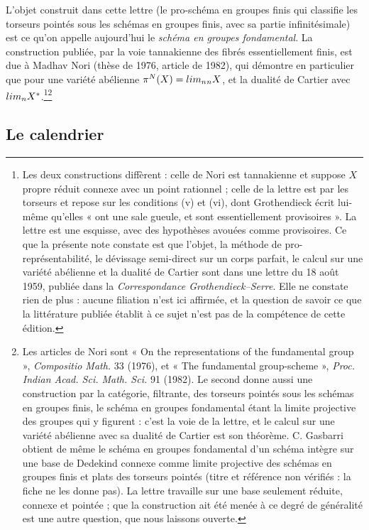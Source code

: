 \documentclass[11pt,a4paper]{article}
\begin{document}
L'objet construit dans cette lettre (le pro-schéma en groupes finis qui
classifie les torseurs pointés sous les schémas en groupes finis, avec sa
partie infinitésimale) est ce qu'on appelle aujourd'hui le \emph{schéma en
groupes fondamental}. La construction publiée, par la voie tannakienne des
fibrés essentiellement finis, est due à Madhav Nori (thèse de 1976, article de
1982), qui démontre en particulier que pour une variété abélienne
$\pi^{N}(X) = \varprojlim_{n} {}_{n}X$, et la dualité de Cartier avec
$\varinjlim {}_{n}X^{*}$.\footnote{Les deux constructions diffèrent :
celle de Nori est tannakienne et suppose $X$ propre réduit connexe avec un
point rationnel ; celle de la lettre est par les torseurs et repose sur les
conditions (v) et (vi), dont Grothendieck écrit lui-même qu'elles « ont une
sale gueule, et sont essentiellement provisoires ». La lettre est une esquisse,
avec des hypothèses avouées comme provisoires. Ce que la
présente note constate est que l'objet, la méthode de pro-représentabilité, le
dévissage semi-direct sur un corps parfait, le calcul sur une variété abélienne
et la dualité de Cartier sont dans une lettre du 18 août 1959, publiée dans la
\emph{Correspondance Grothendieck--Serre}. Elle ne constate rien de plus : aucune filiation n'est ici affirmée,
et la question de savoir ce que la littérature publiée établit à ce sujet n'est
pas de la compétence de cette édition.}\footnote{Les articles de Nori sont
« On the representations of the fundamental group », \emph{Compositio Math.}
33 (1976), et « The fundamental group-scheme », \emph{Proc. Indian Acad. Sci.
Math. Sci.} 91 (1982). Le second donne aussi une construction par la
catégorie, filtrante, des torseurs pointés sous les schémas en groupes finis,
le schéma en groupes fondamental étant la limite projective des groupes qui
y figurent : c'est la voie de la lettre, et le calcul sur une variété
abélienne avec sa dualité de Cartier est son théorème. C. Gasbarri obtient de
même le schéma en groupes fondamental d'un schéma intègre sur une base de
Dedekind connexe comme limite projective des schémas en groupes finis et plats
des torseurs pointés (titre et référence non vérifiés : la fiche ne les donne
pas). La lettre travaille sur
une base seulement réduite, connexe et pointée ; que la construction ait été
menée à ce degré de généralité est une autre question, que nous laissons
ouverte.}

\subsection*{Le calendrier}
\end{document}
